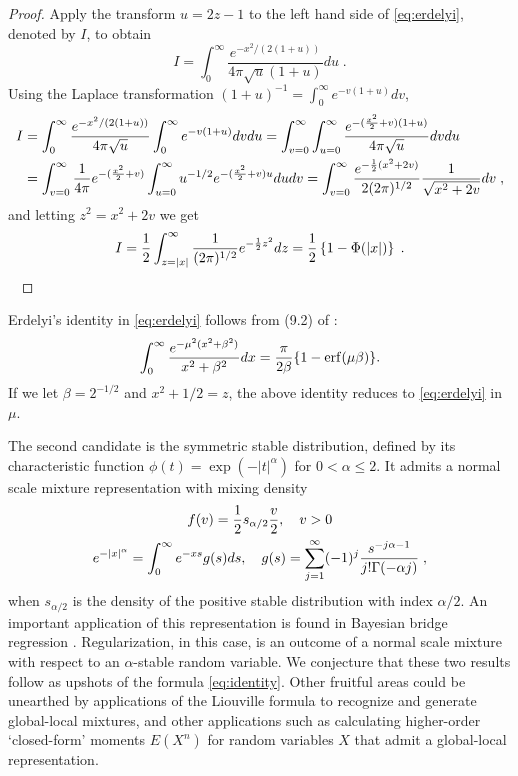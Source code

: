 \documentclass[lineno]{biometrika}
\begin{document}
\begin{proof}
  Apply the transform $u = 2z-1$ to the left hand side of \eqref{eq:erdelyi},
  denoted by $I$, to obtain 
  $$
  I = \int_{0}^{\infty} \frac{e^{-x^2/(2(1+u))}}{4 \pi \sqrt{u} (1+u)} du
  \;.
  $$
  Using the Laplace transformation $(1+u)^{-1} = \int_0^{\infty} e^{-v(1+u)} dv$, 
  \begin{align*}
    I &= \int_{0}^{\infty} \frac{e^{-x^2/(2(1+u))}}{4 \pi \sqrt{u}} 
    \int_0^{\infty} e^{-v(1+u)} dv du 
    = \int_{v= 0}^{\infty} \int_{u=0}^{\infty} 
    \frac{e^{-(\frac{x^2}{2} + v)(1+u)}}{4 \pi \sqrt{u}} dv du
    \\
    &= \int_{v= 0}^{\infty} \frac{1}{4\pi} e^{-(\frac{x^2}{2} + v)} 
    \int_{u=0}^{\infty} u^{-1/2} e^{-(\frac{x^2}{2} + v) u} du dv 
    = \int_{v= 0}^{\infty} \frac{e^{-\frac{1}{2}(x^2 + 2v)}}{2 (2\pi)^{1/2}} 
    \frac{1}{\sqrt{x^2+ 2v}} dv
    \;,
  \end{align*}
  and letting $z^2 = x^2 + 2v$ we get 
  \begin{equation*}
    I = \frac{1}{2} \int_{z = |x|}^{\infty} \frac{1}{(2\pi)^{1/2}} e^{-\frac{1}{2} z^2} dz 
    = \frac{1}{2} \left\{1 - \Phi(|x|)\right\} \;.
  \end{equation*} 
  \ %
\end{proof}

Erdelyi's identity in \eqref{eq:erdelyi} follows from (9.2) of
\cite{amdeberhan_cauchy-schlomilch_2010}: 
$$
\int_0^{\infty} \frac{e^{-\mu^2 (x^2 + \beta^2)}}{x^2+\beta^2} dx 
= \frac{\pi}{2 \beta} \{ 1 - {\rm erf}(\mu \beta) \}.
$$
If we let $\beta = 2^{-1/2}$ and $x^2+1/2 = z$, the above identity reduces to
\eqref{eq:erdelyi} in $\mu$. 

The second candidate is the symmetric stable distribution, defined by its
characteristic function $\phi(t) = \exp( -|t|^{\alpha})$ for $0 < \alpha \leq 2$.  
It admits a normal scale mixture representation with mixing density 
\begin{gather*}
  f(v) = \frac{1}{2} s_{\alpha/2} \frac{v}{2},\quad v > 0 
  \\
  e^{-|x|^\alpha} = \int_0^{\infty} e^{-xs} g(s) ds, \quad g(s) 
  = \sum_{j=1}^{\infty} (-1)^j \frac{s^{-j\alpha-1}}{j! \Gamma(-\alpha j)}
  \;,
\end{gather*}
when $s_{\alpha/2}$ is the density of the positive stable distribution with index 
$\alpha / 2$.  An important application of this representation is found in
Bayesian bridge regression \citep{polson_bayesian_2014}.  Regularization, in this
case, is an outcome of a normal scale mixture with respect to an
$\alpha$-stable random variable.  We conjecture that these two results follow
as upshots of the \CS{} formula \eqref{eq:identity}. Other fruitful areas could
be unearthed by applications of the Liouville formula to recognize and generate
global-local mixtures, and other applications such as calculating higher-order
`closed-form' moments $E(X^n)$ for random variables $X$ that admit a
global-local representation. 



\end{document}
